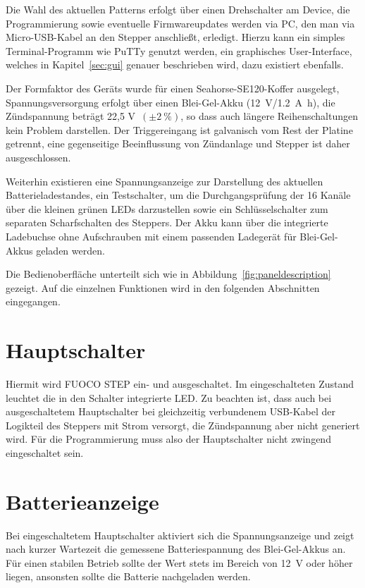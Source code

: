 \documentclass[paper=a4, open=any, numbers=noenddot]{scrbook}
\begin{document}
		Die Wahl des aktuellen Patterns erfolgt über einen Drehschalter am Device, die Programmierung sowie eventuelle Firmwareupdates werden via PC, den man via Micro-USB-Kabel an den Stepper anschließt, erledigt. Hierzu kann ein simples Terminal-Programm wie PuTTy genutzt werden, ein graphisches User-Interface, welches in Kapitel~\ref{sec:gui} genauer beschrieben wird, dazu existiert ebenfalls.

		Der Formfaktor des Geräts wurde für einen Seahorse-SE120-Koffer ausgelegt, Spannungsversorgung erfolgt über einen Blei-Gel-Akku (\SI{12}{\volt}/\SI{1,2}{\ampere\hour}), die Zündspannung beträgt 22,5 V~$(\pm\SI{2}{\percent})$, so dass auch längere Reihenschaltungen kein Problem darstellen. Der Triggereingang ist galvanisch vom Rest der Platine getrennt, eine gegenseitige Beeinflussung von Zündanlage und Stepper ist daher ausgeschlossen.

		Weiterhin existieren eine Spannungsanzeige zur Darstellung des aktuellen Batterieladestandes, ein Testschalter, um die Durchgangsprüfung der 16 Kanäle über die kleinen grünen LEDs darzustellen sowie ein Schlüsselschalter zum separaten Scharfschalten des Steppers. Der Akku kann über die integrierte Ladebuchse ohne Aufschrauben mit einem passenden Ladegerät für Blei-Gel-Akkus geladen werden.

		Die Bedienoberfläche unterteilt sich wie in Abbildung~\ref{fig:paneldescription} gezeigt. Auf die einzelnen Funktionen wird in den folgenden Abschnitten eingegangen.

		\section{Hauptschalter}

			Hiermit wird FUOCO STEP ein- und ausgeschaltet. Im eingeschalteten Zustand leuchtet die in den Schalter integrierte LED. Zu beachten ist, dass auch bei ausgeschaltetem Hauptschalter bei gleichzeitig verbundenem USB-Kabel der Logikteil des Steppers mit Strom versorgt, die Zündspannung aber nicht generiert wird. Für die Programmierung muss also der Hauptschalter nicht zwingend eingeschaltet sein.

		\section{Batterieanzeige}

			Bei eingeschaltetem Hauptschalter aktiviert sich die Spannungsanzeige und zeigt nach kurzer Wartezeit die gemessene Batteriespannung des Blei-Gel-Akkus an. Für einen stabilen Betrieb sollte der Wert stets im Bereich von \SI{12}{\volt} oder höher liegen, ansonsten sollte die Batterie nachgeladen werden.
\end{document}
